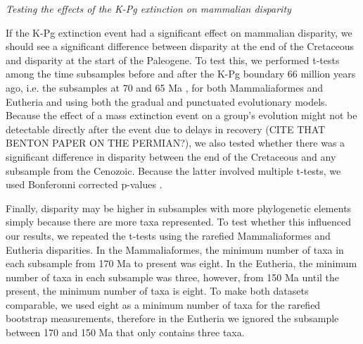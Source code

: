 \documentclass[12pt,letterpaper]{article}
\renewcommand{\subsection}[1]{%
\bigskip
\begin{center}
\begin{large}
\normalfont\itshape #1
\end{large}
\end{center}}
\begin{document}
\subsection{Testing the effects of the K-Pg extinction on mammalian disparity}
If the K-Pg extinction event had a significant effect on mammalian disparity, we should see a significant difference between disparity at the end of the Cretaceous and disparity at the start of the Paleogene.
To test this, we performed t-tests among the time subsamples before and after the K-Pg boundary 66 million years ago, i.e. the subsamples at 70 and 65 Ma \citep{anderson2012using,zelditch2012geometric,smith2014joined}%
, for both Mammaliaformes and Eutheria and using both the gradual and punctuated evolutionary models.
Because the effect of a mass extinction event on a group's evolution might not be detectable directly after the event due to delays in recovery (CITE THAT BENTON PAPER ON THE PERMIAN?), we also tested whether there was a significant difference in disparity between the end of the Cretaceous and any subsample from the Cenozoic.
Because the latter involved multiple t-tests, we used Bonferonni corrected p-values \citep{holm1979simple}.

Finally, disparity may be higher in subsamples with more phylogenetic elements simply because there are more taxa represented.
To test whether this influenced our results, we repeated the t-tests using the rarefied Mammaliaformes and Eutheria disparities.
In the Mammaliaformes, the minimum number of taxa in each subsample from 170 Ma to present was eight.
In the Eutheria, the minimum number of taxa in each subsample was three, however, from 150 Ma until the present, the minimum number of taxa is eight.
To make both datasets comparable, we used eight as a minimum number of taxa for the rarefied bootstrap measurements, therefore in the Eutheria we ignored the subsample between 170 and 150 Ma that only contains three taxa.



\end{document}

